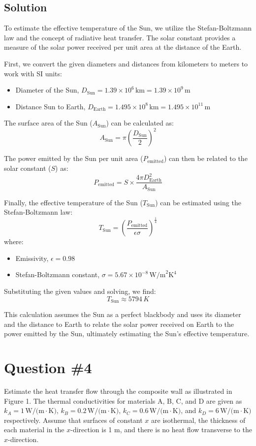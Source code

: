 \documentclass[12pt]{article}
\begin{document}
\subsection*{Solution}
To estimate the effective temperature of the Sun, we utilize the Stefan-Boltzmann law and the concept of radiative heat transfer. The solar constant provides a measure of the solar power received per unit area at the distance of the Earth. 

First, we convert the given diameters and distances from kilometers to meters to work with SI units:
\begin{itemize}
    \item Diameter of the Sun, \( D_{\text{Sun}} = 1.39 \times 10^6 \, \text{km} = 1.39 \times 10^9 \, \text{m} \)
    \item Distance Sun to Earth, \( D_{\text{Earth}} = 1.495 \times 10^8 \, \text{km} = 1.495 \times 10^{11} \, \text{m} \)
\end{itemize}

The surface area of the Sun (\(A_{\text{Sun}}\)) can be calculated as:
\[ A_{\text{Sun}} = \pi \left( \frac{D_{\text{Sun}}}{2} \right)^2 \]

The power emitted by the Sun per unit area (\(P_{\text{emitted}}\)) can then be related to the solar constant (\(S\)) as:
\[ P_{\text{emitted}} = S \times \frac{4 \pi D_{\text{Earth}}^2}{A_{\text{Sun}}} \]

Finally, the effective temperature of the Sun (\(T_{\text{Sun}}\)) can be estimated using the Stefan-Boltzmann law:
\[ T_{\text{Sun}} = \left( \frac{P_{\text{emitted}}}{\epsilon \sigma} \right)^{\frac{1}{4}} \]
where:
\begin{itemize}
    \item Emissivity, \( \epsilon = 0.98 \)
    \item Stefan-Boltzmann constant, \( \sigma = 5.67 \times 10^{-8} \, \text{W/m}^2\text{K}^4 \)
\end{itemize}

Substituting the given values and solving, we find:
\[ T_{\text{Sun}} \approx 5794 \, K \]

This calculation assumes the Sun as a perfect blackbody and uses its diameter and the distance to Earth to relate the solar power received on Earth to the power emitted by the Sun, ultimately estimating the Sun's effective temperature.
\newpage

\section*{Question \#4}
Estimate the heat transfer flow through the composite wall as illustrated in Figure 1. The thermal conductivities for materials A, B, C, and D are given as \( k_A = 1 \, \text{W/(m}\cdot\text{K)} \), \( k_B = 0.2 \, \text{W/(m}\cdot\text{K)} \), \( k_C = 0.6 \, \text{W/(m}\cdot\text{K)} \), and \( k_D = 6 \, \text{W/(m}\cdot\text{K)} \) respectively. Assume that surfaces of constant \( x \) are isothermal, the thickness of each material in the \( x \)-direction is 1 m, and there is no heat flow transverse to the \( x \)-direction.
\end{document}
